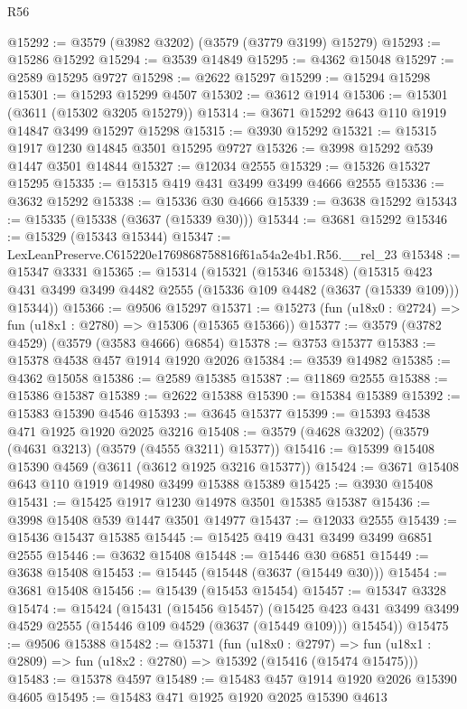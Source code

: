 \begin{lexlean}{R56}
\begin{coremodule}
@15292 := @3579 (@3982 @3202) (@3579 (@3779 @3199) @15279)
@15293 := @15286 @15292
@15294 := @3539 @14849
@15295 := @4362 @15048
@15297 := @2589 @15295 @9727
@15298 := @2622 @15297
@15299 := @15294 @15298
@15301 := @15293 @15299 @4507
@15302 := @3612 @1914
@15306 := @15301 (@3611 (@15302 @3205 @15279))
@15314 := @3671 @15292 @643 @110 @1919 @14847 @3499 @15297 @15298
@15315 := @3930 @15292
@15321 := @15315 @1917 @1230 @14845 @3501 @15295 @9727
@15326 := @3998 @15292 @539 @1447 @3501 @14844
@15327 := @12034 @2555
@15329 := @15326 @15327 @15295
@15335 := @15315 @419 @431 @3499 @3499 @4666 @2555
@15336 := @3632 @15292
@15338 := @15336 @30 @4666
@15339 := @3638 @15292
@15343 := @15335 (@15338 (@3637 (@15339 @30)))
@15344 := @3681 @15292
@15346 := @15329 (@15343 @15344)
@15347 := LexLeanPreserve.C615220e1769868758816f61a54a2e4b1.R56.__rel_23
@15348 := @15347 @3331
@15365 := @15314
    (@15321
      (@15346 @15348)
      (@15315 @423 @431 @3499 @3499 @4482 @2555 (@15336 @109 @4482 (@3637 (@15339 @109))) @15344))
@15366 := @9506 @15297
@15371 := @15273 (fun (u18x0 : @2724) => fun (u18x1 : @2780) => @15306 (@15365 @15366))
@15377 := @3579 (@3782 @4529) (@3579 (@3583 @4666) @6854)
@15378 := @3753 @15377
@15383 := @15378 @4538 @457 @1914 @1920 @2026
@15384 := @3539 @14982
@15385 := @4362 @15058
@15386 := @2589 @15385
@15387 := @11869 @2555
@15388 := @15386 @15387
@15389 := @2622 @15388
@15390 := @15384 @15389
@15392 := @15383 @15390 @4546
@15393 := @3645 @15377
@15399 := @15393 @4538 @471 @1925 @1920 @2025 @3216
@15408 := @3579 (@4628 @3202) (@3579 (@4631 @3213) (@3579 (@4555 @3211) @15377))
@15416 := @15399 @15408 @15390 @4569 (@3611 (@3612 @1925 @3216 @15377))
@15424 := @3671 @15408 @643 @110 @1919 @14980 @3499 @15388 @15389
@15425 := @3930 @15408
@15431 := @15425 @1917 @1230 @14978 @3501 @15385 @15387
@15436 := @3998 @15408 @539 @1447 @3501 @14977
@15437 := @12033 @2555
@15439 := @15436 @15437 @15385
@15445 := @15425 @419 @431 @3499 @3499 @6851 @2555
@15446 := @3632 @15408
@15448 := @15446 @30 @6851
@15449 := @3638 @15408
@15453 := @15445 (@15448 (@3637 (@15449 @30)))
@15454 := @3681 @15408
@15456 := @15439 (@15453 @15454)
@15457 := @15347 @3328
@15474 := @15424
    (@15431
      (@15456 @15457)
      (@15425 @423 @431 @3499 @3499 @4529 @2555 (@15446 @109 @4529 (@3637 (@15449 @109))) @15454))
@15475 := @9506 @15388
@15482 := @15371
    (fun (u18x0 : @2797) =>
    fun (u18x1 : @2809) => fun (u18x2 : @2780) => @15392 (@15416 (@15474 @15475)))
@15483 := @15378 @4597
@15489 := @15483 @457 @1914 @1920 @2026 @15390 @4605
@15495 := @15483 @471 @1925 @1920 @2025 @15390 @4613

\end{coremodule}
\end{lexlean}
